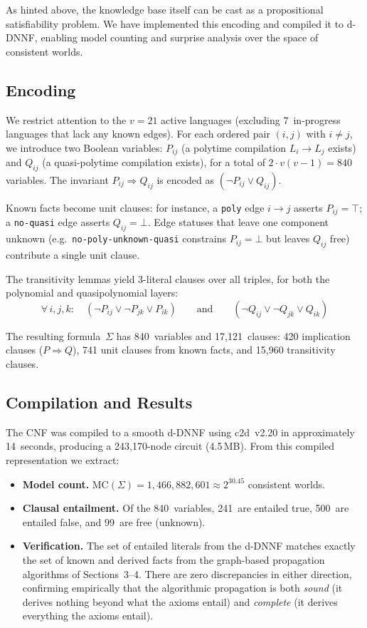 \documentclass[10pt]{article}
\theoremstyle{plain}
\theoremstyle{definition}
\theoremstyle{remark}
\begin{document}
As hinted above, the knowledge base itself can be cast as a propositional satisfiability problem. We have implemented this encoding and compiled it to d-DNNF, enabling model counting and surprise analysis over the space of consistent worlds.

\subsection{Encoding}

We restrict attention to the $v = 21$ active languages (excluding 7~in-progress languages that lack any known edges). For each ordered pair $(i,j)$ with $i \neq j$, we introduce two Boolean variables: $P_{ij}$ (a polytime compilation $L_i \to L_j$ exists) and $Q_{ij}$ (a quasi-polytime compilation exists), for a total of $2 \cdot v(v-1) = 840$ variables. The invariant $P_{ij} \Rightarrow Q_{ij}$ is encoded as $(\lnot P_{ij} \lor Q_{ij})$.

Known facts become unit clauses: for instance, a \texttt{poly} edge $i \to j$ asserts $P_{ij} = \top$; a \texttt{no-quasi} edge asserts $Q_{ij} = \bot$. Edge statuses that leave one component unknown (e.g.\ \texttt{no-poly-unknown-quasi} constrains $P_{ij} = \bot$ but leaves $Q_{ij}$ free) contribute a single unit clause.

The transitivity lemmas yield 3-literal clauses over all triples, for both the polynomial and quasipolynomial layers:
\[
  \forall\, i,j,k:\quad (\lnot P_{ij} \lor \lnot P_{jk} \lor P_{ik}) \qquad\text{and}\qquad (\lnot Q_{ij} \lor \lnot Q_{jk} \lor Q_{ik})
\]

The resulting formula~$\Sigma$ has 840~variables and 17{,}121~clauses: 420 implication clauses ($P \Rightarrow Q$), 741 unit clauses from known facts, and 15{,}960 transitivity clauses.

\subsection{Compilation and Results}

The CNF was compiled to a smooth d-DNNF using c2d~v2.20 in approximately 14~seconds, producing a 243{,}170-node circuit (4.5\,MB). From this compiled representation we extract:

\begin{itemize}
  \item \textbf{Model count.} $\text{MC}(\Sigma) = 1{,}466{,}882{,}601 \approx 2^{30.45}$ consistent worlds.
  \item \textbf{Clausal entailment.} Of the 840~variables, 241~are entailed true, 500~are entailed false, and 99~are free (unknown).
  \item \textbf{Verification.} The set of entailed literals from the d-DNNF matches exactly the set of known and derived facts from the graph-based propagation algorithms of Sections~3--4. There are zero discrepancies in either direction, confirming empirically that the algorithmic propagation is both \emph{sound} (it derives nothing beyond what the axioms entail) and \emph{complete} (it derives everything the axioms entail).
\end{itemize}
\end{document}
